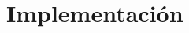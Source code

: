 \documentclass[10pt,letterpaper]{report}
\begin{document}
\part{Implementación}%











%





%

\appendix
%


\end{document}
